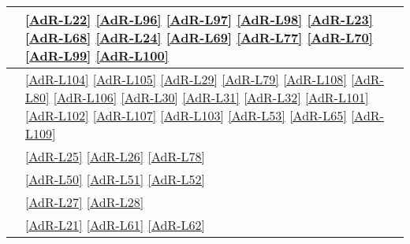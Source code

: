 \begin{longtable}{|>{\centering}P{7cm}|>{\centering}P{5cm}|}
	\hline {} & \ref{AdR-L22} \linebreak \ref{AdR-L96} \linebreak \ref{AdR-L97} \linebreak \ref{AdR-L98} \linebreak \ref{AdR-L23} \linebreak \ref{AdR-L68} \linebreak \ref{AdR-L24} \linebreak \ref{AdR-L69} \linebreak \ref{AdR-L77} \linebreak \ref{AdR-L70} \linebreak \ref{AdR-L99} \linebreak \ref{AdR-L100} \tabularnewline
	\hline {} & \ref{AdR-L104} \linebreak \ref{AdR-L105} \linebreak \ref{AdR-L29} \linebreak \ref{AdR-L79} \linebreak \ref{AdR-L108} \linebreak \ref{AdR-L80} \linebreak \ref{AdR-L106} \linebreak \ref{AdR-L30} \linebreak \ref{AdR-L31} \linebreak \ref{AdR-L32} \linebreak \ref{AdR-L101} \linebreak \ref{AdR-L102} \linebreak \ref{AdR-L107} \linebreak \ref{AdR-L103} \linebreak \ref{AdR-L53} \linebreak \ref{AdR-L65} \linebreak \ref{AdR-L109} \tabularnewline
	\hline {} & \ref{AdR-L25} \linebreak \ref{AdR-L26} \linebreak \ref{AdR-L78} \tabularnewline
	\hline {} & \ref{AdR-L50} \linebreak \ref{AdR-L51} \linebreak \ref{AdR-L52} \tabularnewline
	\hline {} & \ref{AdR-L27} \linebreak \ref{AdR-L28} \tabularnewline
	\hline {} & \ref{AdR-L21} \linebreak \ref{AdR-L61} \linebreak \ref{AdR-L62} \tabularnewline

\end{longtable}
